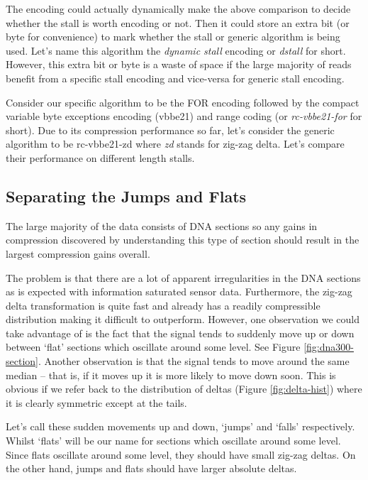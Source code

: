 
The encoding could actually dynamically make the above comparison to decide
whether the stall is worth encoding or not. Then it could store an extra bit (or
byte for convenience) to mark whether the stall or generic algorithm is being
used. Let's name this algorithm the \textit{dynamic stall} encoding or
\textit{dstall} for short. However, this extra bit or byte is a waste of space
if the large majority of reads benefit from a specific stall encoding and
vice-versa for generic stall encoding.

Consider our specific algorithm to be the FOR encoding followed by the compact
variable byte exceptions encoding (vbbe21) and range coding (or
\textit{rc-vbbe21-for} for short). Due to its compression performance so far,
let's consider the generic algorithm to be rc-vbbe21-zd where \textit{zd} stands
for zig-zag delta. Let's compare their performance on different length stalls.

\subsection{Separating the Jumps and Flats}

The large majority of the data consists of DNA sections so any gains in
compression discovered by understanding this type of section should
result in the largest compression gains overall.

The problem is that there are a lot of apparent irregularities in the DNA
sections as is expected with information saturated sensor data. Furthermore, the
zig-zag delta transformation is quite fast and already has a readily
compressible distribution making it difficult to outperform. However, one
observation we could take advantage of is the fact that the signal tends to
suddenly move up or down between `flat' sections which oscillate around some
level. See Figure \ref{fig:dna300-section}. Another observation is that the
signal tends to move around the same median -- that is, if it moves up it is
more likely to move down soon. This is obvious if we refer back to the
distribution of deltas (Figure \ref{fig:delta-hist}) where it is clearly
symmetric except at the tails.



Let's call these sudden movements up and down, `jumps' and `falls'
respectively. Whilst `flats' will be our name for sections which oscillate
around some level. Since flats oscillate around some level, they should have
small zig-zag deltas. On the other hand, jumps and flats should have larger
absolute deltas.

